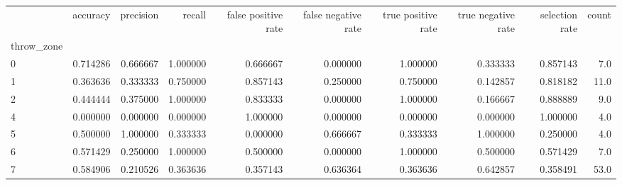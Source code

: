 \begin{tabular}{lrrrrrrrrr}
\toprule
{} &  accuracy &  precision &    recall &  false positive rate &  false negative rate &  true positive rate &  true negative rate &  selection rate &  count \\
throw\_zone &           &            &           &                      &                      &                     &                     &                 &        \\
\midrule
0          &  0.714286 &   0.666667 &  1.000000 &             0.666667 &             0.000000 &            1.000000 &            0.333333 &        0.857143 &    7.0 \\
1          &  0.363636 &   0.333333 &  0.750000 &             0.857143 &             0.250000 &            0.750000 &            0.142857 &        0.818182 &   11.0 \\
2          &  0.444444 &   0.375000 &  1.000000 &             0.833333 &             0.000000 &            1.000000 &            0.166667 &        0.888889 &    9.0 \\
4          &  0.000000 &   0.000000 &  0.000000 &             1.000000 &             0.000000 &            0.000000 &            0.000000 &        1.000000 &    4.0 \\
5          &  0.500000 &   1.000000 &  0.333333 &             0.000000 &             0.666667 &            0.333333 &            1.000000 &        0.250000 &    4.0 \\
6          &  0.571429 &   0.250000 &  1.000000 &             0.500000 &             0.000000 &            1.000000 &            0.500000 &        0.571429 &    7.0 \\
7          &  0.584906 &   0.210526 &  0.363636 &             0.357143 &             0.636364 &            0.363636 &            0.642857 &        0.358491 &   53.0 \\
\bottomrule
\end{tabular}
